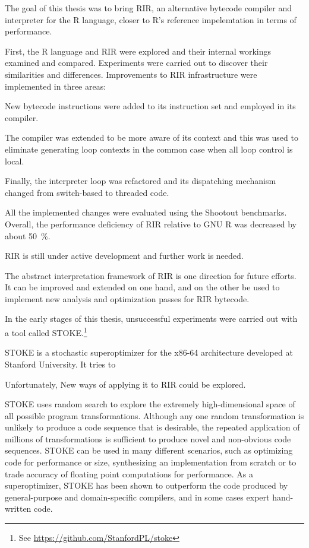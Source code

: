 The goal of this thesis was to bring RIR, an alternative bytecode compiler and interpreter for the R language, closer to R's reference impelemtation in terms of performance.

First, the R language and RIR were explored and their internal workings examined and compared. Experiments were carried out to discover their similarities and differences. Improvements to RIR infrastructure were implemented in three areas:

New bytecode instructions were added to its instruction set and employed in its compiler.

The compiler was extended to be more aware of its context and this was used to eliminate generating loop contexts in the common case when all loop control is local.

Finally, the interpreter loop was refactored and its dispatching mechanism changed from switch-based to threaded code.

All the implemented changes were evaluated using the Shootout benchmarks. Overall, the performance deficiency of RIR relative to GNU R was decreased by about 50~\%.

RIR is still under active development and further work is needed. 



The abstract interpretation framework of RIR is one direction for future efforts. It can be improved and extended on one hand, and on the other be used to implement new analysis and optimization passes for RIR bytecode.

In the early stages of this thesis, unsuccessful experiments were carried out with a tool called STOKE.\footnote{See \url{https://github.com/StanfordPL/stoke}}

STOKE is a stochastic superoptimizer for the x86-64 architecture developed at Stanford University. It tries to 

Unfortunately, New ways of applying it to RIR could be explored.


STOKE uses random search to explore the extremely high-dimensional space of all possible program transformations. Although any one random transformation is unlikely to produce a code sequence that is desirable, the repeated application of millions of transformations is sufficient to produce novel and non-obvious code sequences. STOKE can be used in many different scenarios, such as optimizing code for performance or size, synthesizing an implementation from scratch or to trade accuracy of floating point computations for performance. As a superoptimizer, STOKE has been shown to outperform the code produced by general-purpose and domain-specific compilers, and in some cases expert hand-written code.

